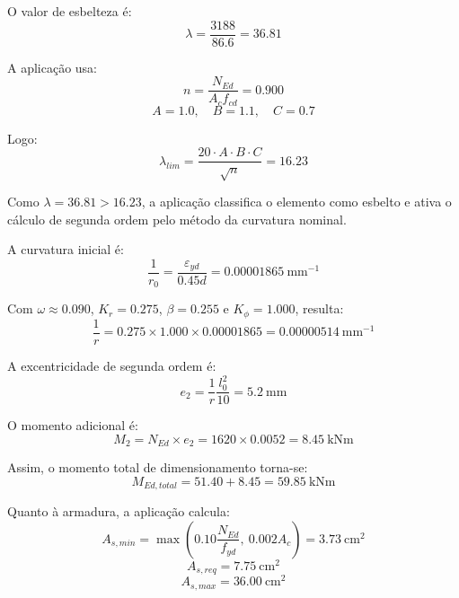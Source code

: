 O valor de esbelteza é:
\begin{equation}
\lambda = \frac{3188}{86.6} = 36.81
\end{equation}

A aplicação usa:
\begin{equation}
n = \frac{N_{Ed}}{A_c f_{cd}} = 0.900
\end{equation}
\begin{equation}
A = 1.0,\quad B = 1.1,\quad C = 0.7
\end{equation}

Logo:
\begin{equation}
\lambda_{lim} = \frac{20 \cdot A \cdot B \cdot C}{\sqrt{n}} = 16.23
\end{equation}

Como \(\lambda = 36.81 > 16.23\), a aplicação classifica o elemento como esbelto e ativa o cálculo de segunda ordem pelo método da curvatura nominal.

A curvatura inicial é:
\begin{equation}
\frac{1}{r_0} = \frac{\varepsilon_{yd}}{0.45d} = 0.00001865\ \text{mm}^{-1}
\end{equation}

Com \(\omega \approx 0.090\), \(K_r=0.275\), \(\beta=0.255\) e \(K_\phi=1.000\), resulta:
\begin{equation}
\frac{1}{r} = 0.275 \times 1.000 \times 0.00001865 = 0.00000514\ \text{mm}^{-1}
\end{equation}

A excentricidade de segunda ordem é:
\begin{equation}
e_2 = \frac{1}{r}\frac{l_0^2}{10} = 5.2\ \text{mm}
\end{equation}

O momento adicional é:
\begin{equation}
M_2 = N_{Ed}\times e_2 = 1620 \times 0.0052 = 8.45\ \text{kNm}
\end{equation}

Assim, o momento total de dimensionamento torna-se:
\begin{equation}
M_{Ed,total} = 51.40 + 8.45 = 59.85\ \text{kNm}
\end{equation}

Quanto à armadura, a aplicação calcula:
\begin{equation}
A_{s,min} = \max\left(0.10\frac{N_{Ed}}{f_{yd}},\ 0.002A_c\right)=3.73\ \text{cm}^2
\end{equation}
\begin{equation}
A_{s,req} = 7.75\ \text{cm}^2
\end{equation}
\begin{equation}
A_{s,max}=36.00\ \text{cm}^2
\end{equation}

